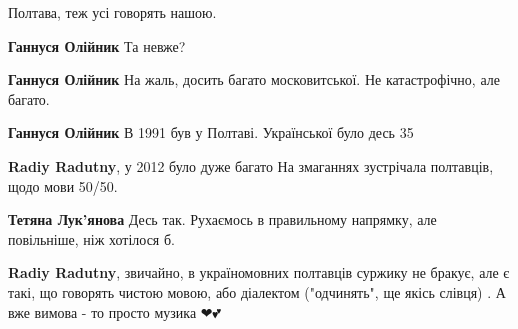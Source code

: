 \begin{itemize}
Полтава, теж усі говорять нашою.

\begin{itemize}
 
\textbf{Ганнуся Олійник} Та невже?

 
\textbf{Ганнуся Олійник} На жаль, досить багато московитської. Не катастрофічно, але багато.

 
\textbf{Ганнуся Олійник} В 1991 був у Полтаві. Української було десь 35%

 
\textbf{Radiy Radutny}, у 2012 було дуже багато На змаганнях зустрічала полтавців, щодо мови 50/50.

 
\textbf{Тетяна Лук'янова} Десь так. Рухаємось в правильному напрямку, але повільніше, ніж хотілося б.

 
\textbf{Radiy Radutny}, звичайно, в україномовних полтавців суржику не бракує, але є такі, що говорять чистою мовою, або діалектом ("одчинять", ще якісь слівця) . А вже вимова - то просто музика ❤💕


\end{itemize}
\end{itemize}
